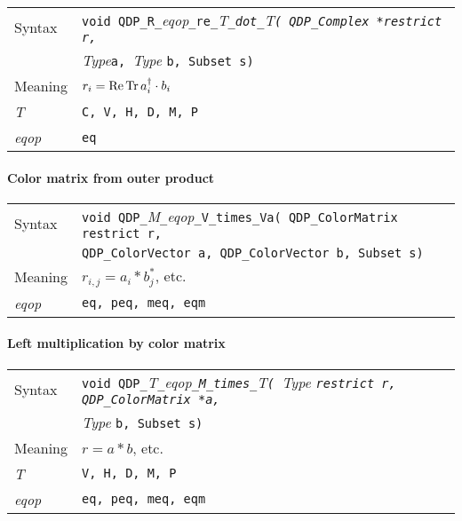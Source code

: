 \documentclass{article}
\renewcommand{\Re}{\mathop{\rm Re}}
\newcommand{\Tr}{\mathop{\rm Tr}}
\newcommand{\tComplex}{QDP\ttdash Complex }
\newcommand{\tColorMatrix}{QDP\ttdash ColorMatrix }
\newcommand{\tColorVector}{QDP\ttdash ColorVector }
\newcommand{\namespace}{QDP}
\newcommand{\allEqOps}{{\tt eq, peq, meq, eqm}}
\newcommand{\ttdash}{{\tt \_}}
\newcommand{\itt}{\it T}
\newcommand{\extraarg}{, Subset s}
\begin{document}
\begin{flushleft}
  \begin{tabular}{|l|l|}
  \hline
  Syntax      & {\tt void \namespace}\ttdash{\tt R}\ttdash{\it eqop}\ttdash{\tt re}\ttdash\itt\ttdash{\tt dot}\ttdash\itt{\tt ( \tComplex *restrict r, }\\
              & {\it Type}{\tt *a, }{\it Type }{\tt *b\extraarg)} \\
  \hline
  Meaning     & $r_i = \Re \Tr a^\dagger_i \cdot b_i$ \\
  \hline
  \itt        & {\tt C, V, H, D, M, P} \\
  \hline
  {\it eqop}  & {\tt eq} \\
  \hline
  \end{tabular}
\end{flushleft}

\paragraph{Color matrix from outer product}

\begin{flushleft}
  \begin{tabular}{|l|l|}
  \hline
  Syntax      & {\tt void \namespace}\ttdash{\it M}\ttdash{\it eqop}\ttdash{\tt V}\ttdash{\tt times}\ttdash{\tt Va( }{\tt \tColorMatrix }{\tt *restrict r, }\\
              & {\tt \tColorVector }{\tt *a, }{\tt \tColorVector }{\tt *b\extraarg)} \\
  \hline
  Meaning     & $r_{i,j} = a_i * b_j^*$, etc. \\
  \hline
  {\it eqop}  & \allEqOps \\
  \hline
  \end{tabular}
\end{flushleft}

\paragraph{Left multiplication by color matrix}

\begin{flushleft}
  \begin{tabular}{|l|l|}
  \hline
  Syntax      & {\tt void \namespace}\ttdash\itt\ttdash{\it eqop}\ttdash{\tt M}\ttdash{\tt times}\ttdash\itt{\tt ( }{\it Type }{\tt *restrict r, \tColorMatrix *a, }\\
              & {\it Type }{\tt *b\extraarg)} \\
  \hline
  Meaning     & $r = a * b$, etc. \\
  \hline
  \itt        & {\tt V, H, D, M, P} \\
  \hline
  {\it eqop}  & \allEqOps \\
  \hline
  \end{tabular}
\end{flushleft}
\end{document}

